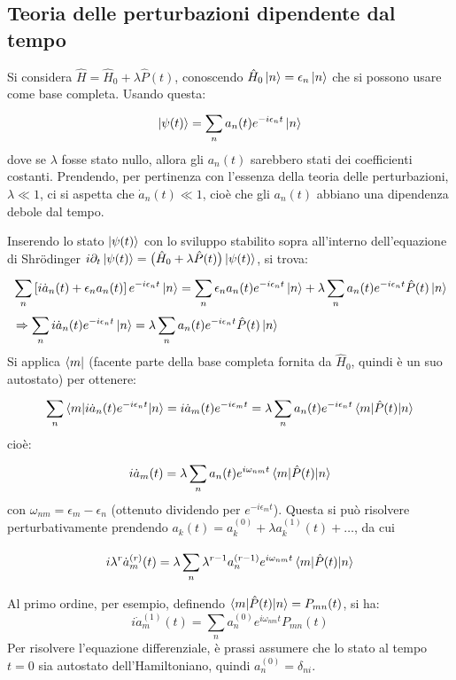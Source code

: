 \documentclass[11pt, a4paper]{scrartcl} %
\numberwithin{equation}{subsection}
\theoremstyle{style2}
\theoremstyle{style1}
\newenvironment{boxenv}[1][]{
    \begin{eqbox}[#1]
    }{
   \end{eqbox}
}
\begin{document}
\subsection{Teoria delle perturbazioni dipendente dal tempo}
Si considera $\hat{H} = \hat{H}_0 + \lambda \hat{P}(t)$, conoscendo $\hat{H}_0 \ket{n} = \epsilon _n \ket{n} $ che si possono usare come base completa.
Usando questa:
\[
\ket{\psi (t)} = \sum_{n}^{} a_n(t) e^{-i \epsilon _n t} \ket{n} 
\] 
dove se $\lambda $ fosse stato nullo, allora gli $a_n(t) $ sarebbero stati dei coefficienti costanti.
Prendendo, per pertinenza con l'essenza della teoria delle perturbazioni, $\lambda \ll 1$, ci si aspetta che $\dot{a}_n(t) \ll 1$, cio\`e che gli $a_n(t)$ abbiano una dipendenza debole dal tempo.

Inserendo lo stato $\ket{\psi (t)} $ con lo sviluppo stabilito sopra all'interno dell'equazione di Shr\"odinger $i \partial _t \ket{\psi (t)} = \big(\hat{H}_0 + \lambda \hat{P}(t)\big) \ket{\psi (t)} $, si trova:
\[
	\begin{split}
		&\sum_{n}^{} \left[ i \dot{a}_n(t) +\epsilon _n a_n(t) \right]  e^{-i \epsilon _n t} \ket{n} = \sum_{n}^{} \epsilon _n a_n(t) e^{-i \epsilon _n t} \ket{n} + \lambda \sum_{n}^{} a_n(t) e^{-i \epsilon _n  t} \hat{P}(t) \ket{n} \\
		&\Rightarrow \sum_{n}^{}  i \dot{a}_n(t) e^{-i \epsilon _n t} \ket{n} =\lambda \sum_{n}^{} a_n(t) e^{-i \epsilon _n  t} \hat{P}(t) \ket{n} 
	\end{split}
\] 
Si applica $\bra{m} $ (facente parte della base completa fornita da $\hat{H}_0$, quindi \`e un suo autostato) per ottenere:
\[
\sum_{n}^{} \braket{m|i\dot{a}_n(t) e^{-i \epsilon _n t}  |n} = i \dot{a}_m(t) e^{-i\epsilon _m t} =\lambda \sum_{n}^{} a_n(t) e^{-i \epsilon _n t} \braket{m|\hat{P}(t)|n} 
\] 
cio\`e:
\begin{equation}
	i \dot{a}_m(t) = \lambda \sum_{n}^{} a_n(t) e^{i\omega_{nm} t} \braket{m|\hat{P}(t)|n} 
\end{equation}
con $\omega_{nm } = \epsilon _m - \epsilon _n$ (ottenuto dividendo per $e^{-i\epsilon _m t} $).
Questa si pu\`o risolvere perturbativamente prendendo $a_k(t) = a_k^{(0)} + \lambda a_k^{(1)} (t) + \ldots$, da cui
\begin{boxenv}[]
\begin{equation}
	i \lambda ^r \dot{a}_m^{(r)} (t) =  \lambda \sum_{n}^{} \lambda ^{r-1}  a_n^{(r-1)} e^{i \omega_{nm} t} \braket{m|\hat{P}(t)|n} 
\end{equation}
\end{boxenv}
\noindent Al primo ordine, per esempio, definendo $\braket{m|\hat{P}(t)|n} = P_{mn} (t)$, si ha:
\begin{equation}
	i \dot{a}_m^{(1)} (t) = \sum_{n}^{} a_n^{(0)} e^{i\omega_{nm} t} P_{mn} (t)
\end{equation}
Per risolvere l'equazione differenziale, \`e prassi assumere che lo stato al tempo $t=0$ sia autostato dell'Hamiltoniano, quindi $a_n^{(0)} = \delta _{ni} $.
\end{document}
